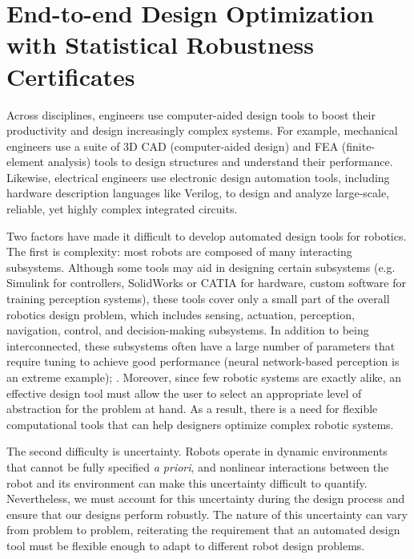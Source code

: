 \chapter{End-to-end Design Optimization with Statistical Robustness Certificates}\label{ch:rss}

Across disciplines, engineers use computer-aided design tools to boost their productivity and design increasingly complex systems. For example, mechanical engineers use a suite of 3D CAD (computer-aided design) and FEA (finite-element analysis) tools to design structures and understand their performance. Likewise, electrical engineers use electronic design automation tools, including hardware description languages like Verilog, to design and analyze large-scale, reliable, yet highly complex integrated circuits. 

Two factors have made it difficult to develop automated design tools for robotics. The first is complexity: most robots are composed of many interacting subsystems. Although some tools may aid in designing certain subsystems (e.g. Simulink for controllers, SolidWorks or CATIA for hardware, custom software for training perception systems), these tools cover only a small part of the overall robotics design problem, which includes sensing, actuation, perception, navigation, control, and decision-making subsystems. In addition to being interconnected, these subsystems often have a large number of parameters that require tuning to achieve good performance (neural network-based perception is an extreme example); . Moreover, since few robotic systems are exactly alike, an effective design tool must allow the user to select an appropriate level of abstraction for the problem at hand. As a result, there is a need for flexible computational tools that can help designers optimize complex robotic systems.

The second difficulty is uncertainty. Robots operate in dynamic environments that cannot be fully specified \textit{a priori}, and nonlinear interactions between the robot and its environment can make this uncertainty difficult to quantify. Nevertheless, we must account for this uncertainty during the design process and ensure that our designs perform robustly. The nature of this uncertainty can vary from problem to problem, reiterating the requirement that an automated design tool must be flexible enough to adapt to different robot design problems.

